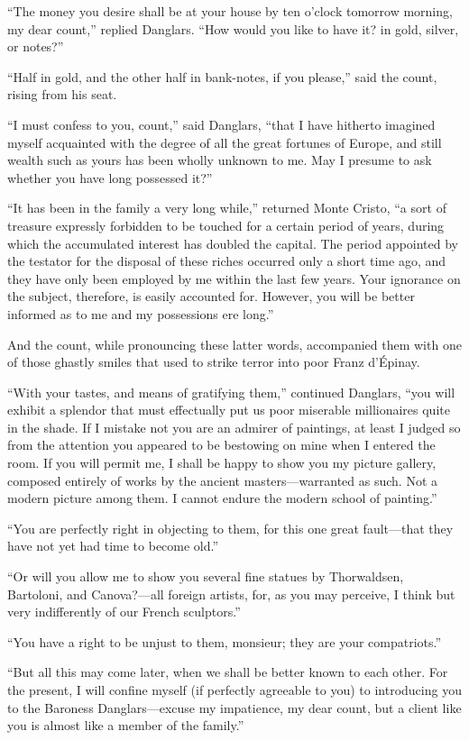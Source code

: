 “The money you desire shall be at your house by ten o’clock tomorrow
morning, my dear count,” replied Danglars. “How would you like to have
it? in gold, silver, or notes?”

“Half in gold, and the other half in bank-notes, if you please,” said
the count, rising from his seat.

“I must confess to you, count,” said Danglars, “that I have hitherto
imagined myself acquainted with the degree of all the great fortunes of
Europe, and still wealth such as yours has been wholly unknown to me.
May I presume to ask whether you have long possessed it?”

“It has been in the family a very long while,” returned Monte Cristo,
“a sort of treasure expressly forbidden to be touched for a certain
period of years, during which the accumulated interest has doubled the
capital. The period appointed by the testator for the disposal of these
riches occurred only a short time ago, and they have only been employed
by me within the last few years. Your ignorance on the subject,
therefore, is easily accounted for. However, you will be better
informed as to me and my possessions ere long.”

And the count, while pronouncing these latter words, accompanied them
with one of those ghastly smiles that used to strike terror into poor
Franz d’Épinay.

“With your tastes, and means of gratifying them,” continued Danglars,
“you will exhibit a splendor that must effectually put us poor
miserable millionaires quite in the shade. If I mistake not you are an
admirer of paintings, at least I judged so from the attention you
appeared to be bestowing on mine when I entered the room. If you will
permit me, I shall be happy to show you my picture gallery, composed
entirely of works by the ancient masters—warranted as such. Not a
modern picture among them. I cannot endure the modern school of
painting.”

“You are perfectly right in objecting to them, for this one great
fault—that they have not yet had time to become old.”

“Or will you allow me to show you several fine statues by Thorwaldsen,
Bartoloni, and Canova?—all foreign artists, for, as you may perceive, I
think but very indifferently of our French sculptors.”

“You have a right to be unjust to them, monsieur; they are your
compatriots.”

“But all this may come later, when we shall be better known to each
other. For the present, I will confine myself (if perfectly agreeable
to you) to introducing you to the Baroness Danglars—excuse my
impatience, my dear count, but a client like you is almost like a
member of the family.”

